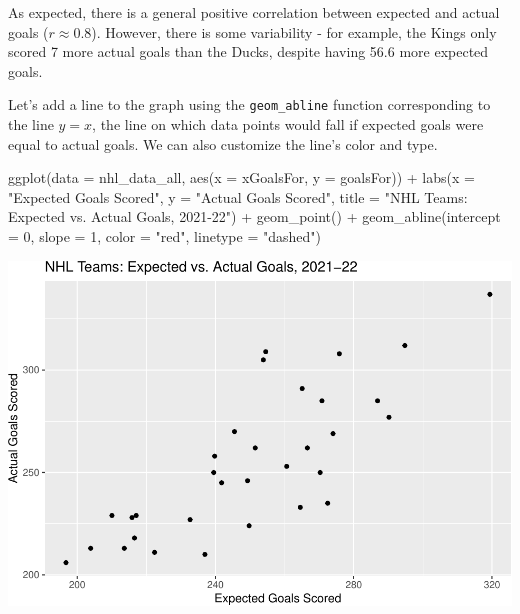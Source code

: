 \documentclass[
  11pt,
]{book}
\newenvironment{Shaded}{\begin{snugshade}}{\end{snugshade}}
\newcommand{\AttributeTok}[1]{\textcolor[rgb]{0.77,0.63,0.00}{#1}}
\newcommand{\DecValTok}[1]{\textcolor[rgb]{0.00,0.00,0.81}{#1}}
\newcommand{\FunctionTok}[1]{\textcolor[rgb]{0.00,0.00,0.00}{#1}}
\newcommand{\NormalTok}[1]{#1}
\newcommand{\SpecialCharTok}[1]{\textcolor[rgb]{0.00,0.00,0.00}{#1}}
\newcommand{\StringTok}[1]{\textcolor[rgb]{0.31,0.60,0.02}{#1}}
\theoremstyle{definition}
\theoremstyle{definition}
\theoremstyle{definition}
\theoremstyle{definition}
\theoremstyle{remark}
\begin{document}
As expected, there is a general positive correlation between expected and actual goals (\(r \approx 0.8\)). However, there is some variability - for example, the Kings only scored 7 more actual goals than the Ducks, despite having 56.6 more expected goals.

Let's add a line to the graph using the \texttt{geom\_abline} function corresponding to the line \(y=x\), the line on which data points would fall if expected goals were equal to actual goals. We can also customize the line's color and type.

\begin{Shaded}
\begin{Highlighting}[]
\FunctionTok{ggplot}\NormalTok{(}\AttributeTok{data =}\NormalTok{ nhl\_data\_all, }\FunctionTok{aes}\NormalTok{(}\AttributeTok{x =}\NormalTok{ xGoalsFor, }\AttributeTok{y =}\NormalTok{ goalsFor)) }\SpecialCharTok{+} \FunctionTok{labs}\NormalTok{(}\AttributeTok{x =} \StringTok{"Expected Goals Scored"}\NormalTok{,}
    \AttributeTok{y =} \StringTok{"Actual Goals Scored"}\NormalTok{, }\AttributeTok{title =} \StringTok{"NHL Teams: Expected vs. Actual Goals, 2021{-}22"}\NormalTok{) }\SpecialCharTok{+}
    \FunctionTok{geom\_point}\NormalTok{() }\SpecialCharTok{+} \FunctionTok{geom\_abline}\NormalTok{(}\AttributeTok{intercept =} \DecValTok{0}\NormalTok{, }\AttributeTok{slope =} \DecValTok{1}\NormalTok{, }\AttributeTok{color =} \StringTok{"red"}\NormalTok{, }\AttributeTok{linetype =} \StringTok{"dashed"}\NormalTok{)}
\end{Highlighting}
\end{Shaded}

\includegraphics{series_files/figure-latex/unnamed-chunk-26-1.pdf}
\end{document}
